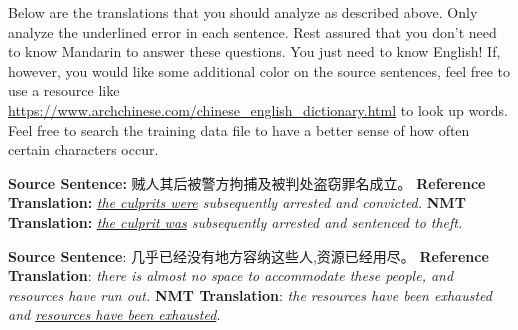 \begin{parts}
    Below are the translations that you should analyze as described above. Only analyze the underlined error in each sentence. Rest assured that you don't need to know Mandarin to answer these questions. You just need to know English! If, however, you would like some additional color on the source sentences, feel free to use a resource like \url{https://www.archchinese.com/chinese_english_dictionary.html} to look up words. Feel free to search the training data file to have a better sense of how often certain characters occur.

    \begin{subparts}
        \subpart[2]
        \textbf{Source Sentence:} 贼人其后被警方拘捕及被判处盗窃罪名成立。 \newline
        \textbf{Reference Translation:} \textit{\underline{the culprits were} subsequently arrested and convicted.}\newline
        \textbf{NMT Translation:} \textit{\underline{the culprit was} subsequently arrested and sentenced to theft.}
        
        

        \subpart[2]
        \textbf{Source Sentence}: 几乎已经没有地方容纳这些人,资源已经用尽。\newline
        \textbf{Reference Translation}: \textit{there is almost no space to accommodate these people, and resources have run out.   }\newline
        \textbf{NMT Translation}: \textit{the resources have been exhausted and \underline{resources have been exhausted}.}
        

\end{subparts}
\end{parts}
